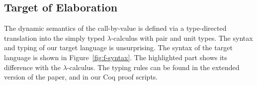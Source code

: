 



\subsection{Target of Elaboration}
The dynamic semantics of the call-by-value \name is defined via a
type-directed translation into the simply typed $\lambda$-calculus
with pair and unit types. 
The syntax and typing of our target language is unsurprising. The syntax of the
target language is shown in Figure~\ref{fig:f-syntax}. The highlighted part
shows its difference with the $\lambda$-calculus. 
The typing rules can 
be found in the extended version of the paper, and in our Coq proof
scripts.

